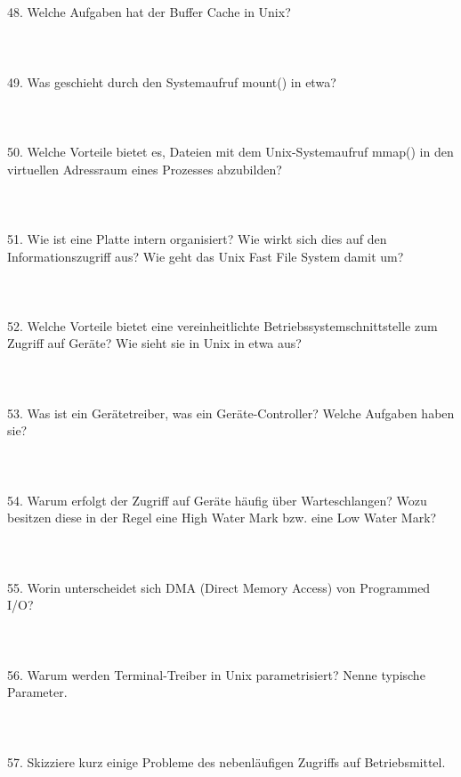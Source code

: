 \documentclass{article}
\begin{document}
\\
\\
48. Welche Aufgaben hat der Buffer Cache in Unix?
\\
\\
\\
\\
49. Was geschieht durch den Systemaufruf mount() in etwa?
\\
\\
\\
\\
50. Welche Vorteile bietet es, Dateien mit dem Unix-Systemaufruf mmap() in den virtuellen
Adressraum eines Prozesses abzubilden?
\\
\\
\\
\\
51. Wie ist eine Platte intern organisiert? Wie wirkt sich dies auf den Informationszugriff aus?
Wie geht das Unix Fast File System damit um?
\\
\\
\\
\\
52. Welche Vorteile bietet eine vereinheitlichte Betriebssystemschnittstelle zum Zugriff auf
Geräte? Wie sieht sie in Unix in etwa aus?
\\
\\
\\
\\
53. Was ist ein Gerätetreiber, was ein Geräte-Controller? Welche Aufgaben haben sie?
\\
\\
\\
\\
54. Warum erfolgt der Zugriff auf Geräte häufig über Warteschlangen? Wozu besitzen diese in
der Regel eine High Water Mark bzw. eine Low Water Mark?
\\
\\
\\
\\
55. Worin unterscheidet sich DMA (Direct Memory Access) von Programmed I/O?
\\
\\
\\
\\
56. Warum werden Terminal-Treiber in Unix parametrisiert? Nenne typische Parameter.
\\
\\
\\
\\
57. Skizziere kurz einige Probleme des nebenläufigen Zugriffs auf Betriebsmittel.
\end{document}
